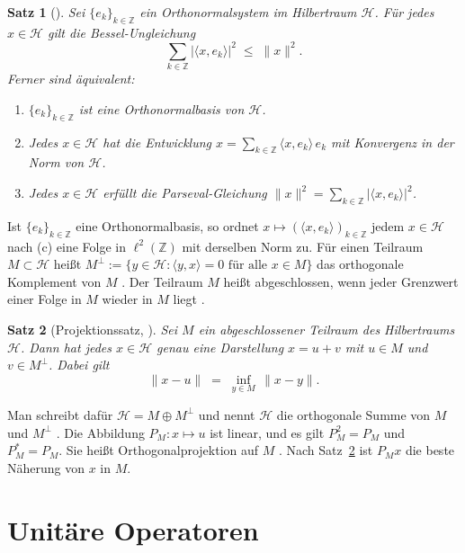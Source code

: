 \documentclass[a4paper,11pt,bibliography=totoc,listof=totoc,headinclude=true,cleardoublepage=empty,oneside]{scrbook}
\theoremstyle{plain}
\newtheorem{Satz}{Satz}[chapter]
\theoremstyle{definition}
\newcommand{\Z}{\mathbb{Z}}
\newcommand{\ellZwei}{\ell^2(\Z)}
\newcommand{\scal}[2]{\langle #1, #2 \rangle}
\newcommand{\norm}[1]{\lVert #1 \rVert}
\newcommand{\abs}[1]{\lvert #1 \rvert}
\begin{document}
\begin{Satz}[{\cite[Übung~25.2, Satz~25.18]{serov}}] %
\label{satz:onb}
Sei $\{e_k\}_{k\in\Z}$ ein Orthonormalsystem im Hilbertraum $\mathcal H$. Für
jedes $x\in\mathcal H$ gilt die Bessel-Ungleichung
\[
  \sum_{k\in\Z} \abs{\scal{x}{e_k}}^2 \;\le\; \norm{x}^2 .
\]
Ferner sind äquivalent:
\begin{enumerate}
\item[(a)] $\{e_k\}_{k\in\Z}$ ist eine Orthonormalbasis von $\mathcal H$.
\item[(b)] Jedes $x\in\mathcal H$ hat die Entwicklung
  $x = \sum_{k\in\Z}\scal{x}{e_k}\,e_k$ mit Konvergenz in der Norm von
  $\mathcal H$.
\item[(c)] Jedes $x\in\mathcal H$ erfüllt die Parseval-Gleichung
  $\norm{x}^2 = \sum_{k\in\Z}\abs{\scal{x}{e_k}}^2$.
\end{enumerate}
\end{Satz}

Ist $\{e_k\}_{k\in\Z}$ eine Orthonormalbasis, so ordnet
$x\mapsto(\scal{x}{e_k})_{k\in\Z}$ jedem $x\in\mathcal H$ nach (c) eine Folge
in $\ellZwei$ mit derselben Norm zu.
Für einen Teilraum $M\subset\mathcal H$ hei\ss t
$M^\perp := \{y\in\mathcal H : \scal{y}{x} = 0 \text{ für alle } x\in M\}$
das orthogonale Komplement von $M$ \cite[Def.~25.8]{serov}. %
Der Teilraum $M$ hei\ss t abgeschlossen, wenn jeder Grenzwert einer Folge in
$M$ wieder in $M$ liegt \cite[Def.~25.10]{serov}. %

\begin{Satz}[Projektionssatz, {\cite[Satz~25.12]{serov}}] %
\label{satz:projektion}
Sei $M$ ein abgeschlossener Teilraum des Hilbertraums $\mathcal H$. Dann hat
jedes $x\in\mathcal H$ genau eine Darstellung $x = u + v$ mit $u\in M$ und
$v\in M^\perp$. Dabei gilt
\[
  \norm{x - u} \;=\; \inf_{y\in M}\,\norm{x - y} .
\]
\end{Satz}

Man schreibt dafür $\mathcal H = M\oplus M^\perp$ und nennt $\mathcal H$ die
orthogonale Summe von $M$ und $M^\perp$ \cite[Satz~25.12]{serov}. %
Die Abbildung $P_M\colon x\mapsto u$ ist linear, und es gilt $P_M^2 = P_M$ und
$P_M^* = P_M$. Sie hei\ss t Orthogonalprojektion auf $M$
\cite[Def.~27.1, Prop.~27.2\,(4)]{serov}. %
Nach Satz~\ref{satz:projektion} ist $P_M x$ die beste Näherung von $x$ in $M$.

\section{Unitäre Operatoren}
\label{sec:unitaer}
\end{document}
